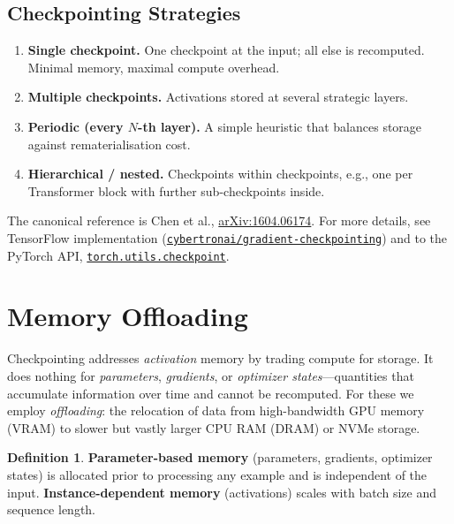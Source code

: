 \documentclass[11pt,a4paper]{article}
\theoremstyle{definition}
\newtheorem{definition}{Definition}[section]
\theoremstyle{remark}
\theoremstyle{plain}
\begin{document}
\subsection{Checkpointing Strategies}

\begin{enumerate}[leftmargin=1.8em, itemsep=2pt]
    \item \textbf{Single checkpoint.} One checkpoint at the input; all
    else is recomputed. Minimal memory, maximal compute overhead.
    \item \textbf{Multiple checkpoints.} Activations stored at several
    strategic layers.
    \item \textbf{Periodic (every $N$-th layer).} A simple heuristic that
    balances storage against rematerialisation cost.
    \item \textbf{Hierarchical / nested.} Checkpoints within checkpoints,
    e.g., one per Transformer block with further sub-checkpoints inside.
\end{enumerate}

The canonical reference is Chen et al.,
\href{https://arxiv.org/pdf/1604.06174.pdf}{arXiv:1604.06174}. For more details, see TensorFlow implementation
(\href{http://github.com/cybertronai/gradient-checkpointing}{\texttt{cybertronai/gradient-checkpointing}})
and to the PyTorch API,
\href{http://pytorch.org/docs/stable/checkpoint.html}{\texttt{torch.utils.checkpoint}}.

\section{Memory Offloading}

Checkpointing addresses \emph{activation} memory by trading compute for
storage. It does nothing for \emph{parameters}, \emph{gradients}, or
\emph{optimizer states}---quantities that accumulate information over
time and cannot be recomputed. For these we employ \emph{offloading}: the
relocation of data from high-bandwidth GPU memory (VRAM) to slower but
vastly larger CPU RAM (DRAM) or NVMe storage.


\begin{definition}
\textbf{Parameter-based memory} (parameters, gradients, optimizer states)
is allocated prior to processing any example and is independent of the
input. \textbf{Instance-dependent memory} (activations) scales with batch
size and sequence length.
\end{definition}
\end{document}
